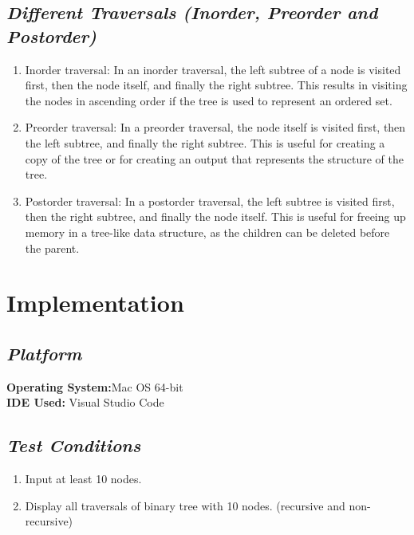 \documentclass{article}
\begin{document}
\subsection{\textit{Different Traversals (Inorder, Preorder and Postorder)}}
\begin{enumerate}
	\item Inorder traversal: In an inorder traversal, the left subtree of a node is visited first, then the node itself, and finally the right subtree. This results in visiting the nodes in ascending order if the tree is used to represent an ordered set.
	\item Preorder traversal: In a preorder traversal, the node itself is visited first, then the left subtree, and finally the right subtree. This is useful for creating a copy of the tree or for creating an output that represents the structure of the tree.
	\item Postorder traversal: In a postorder traversal, the left subtree is visited first, then the right subtree, and finally the node itself. This is useful for freeing up memory in a tree-like data structure, as the children can be deleted before the parent.
\end{enumerate}
\section{\textbf{Implementation}}
\subsection{\textit{Platform}}
\textbf{Operating System:}Mac OS 64-bit\\
\textbf{IDE Used:} Visual Studio Code\\
\subsection{\textit{Test Conditions}}
\begin{enumerate}
	\item Input at least 10 nodes.
	\item Display all traversals of binary tree with 10 nodes. (recursive and non-recursive)
\end{enumerate}
\end{document}
